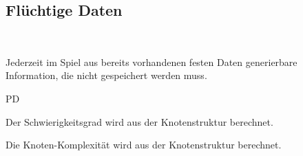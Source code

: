 %
%


\subsection{Flüchtige Daten}~\\
\label{DT:fluechtDat}

Jederzeit im Spiel aus bereits vorhandenen festen Daten generierbare Information, die nicht gespeichert werden muss.



\begin{ids}{\gls{PD}}

	\id[130] Der Schwierigkeitsgrad wird aus der Knotenstruktur berechnet.
	
	\id[140] Die Knoten-Komplexität wird aus der Knotenstruktur berechnet.

\end{ids}





